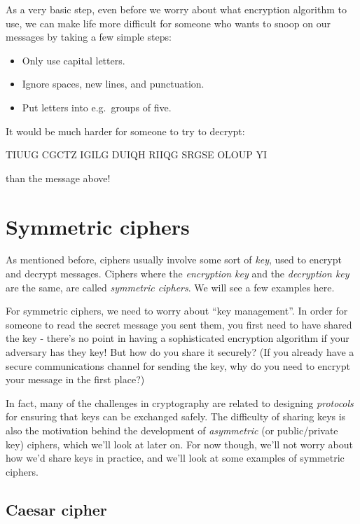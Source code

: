 \documentclass[
  letterpaper,
  DIV=11,
  numbers=noendperiod]{scrreprt}
\providecommand{\tightlist}{%
  \setlength{\itemsep}{0pt}\setlength{\parskip}{0pt}}\usepackage{longtable,booktabs,array}
\begin{document}
As a very basic step, even before we worry about what encryption
algorithm to use, we can make life more difficult for someone who wants
to snoop on our messages by taking a few simple steps:

\begin{itemize}
\tightlist
\item
  Only use capital letters.
\item
  Ignore spaces, new lines, and punctuation.
\item
  Put letters into e.g.~groups of five.
\end{itemize}

It would be much harder for someone to try to decrypt:

TIUUG CGCTZ IGILG DUIQH RIIQG SRGSE OLOUP YI

than the message above!

\part{Symmetric ciphers}

As mentioned before, ciphers usually involve some sort of \emph{key},
used to encrypt and decrypt messages. Ciphers where the \emph{encryption
key} and the \emph{decryption key} are the same, are called
\emph{symmetric ciphers}. We will see a few examples here.

For symmetric ciphers, we need to worry about ``key management''. In
order for someone to read the secret message you sent them, you first
need to have shared the key - there's no point in having a sophisticated
encryption algorithm if your adversary has they key! But how do you
share it securely? (If you already have a secure communications channel
for sending the key, why do you need to encrypt your message in the
first place?)

In fact, many of the challenges in cryptography are related to designing
\emph{protocols} for ensuring that keys can be exchanged safely. The
difficulty of sharing keys is also the motivation behind the development
of \emph{asymmetric} (or public/private key) ciphers, which we'll look
at later on. For now though, we'll not worry about how we'd share keys
in practice, and we'll look at some examples of symmetric ciphers.

\hypertarget{caesar-cipher}{%
\chapter{Caesar cipher}\label{caesar-cipher}}
\end{document}
